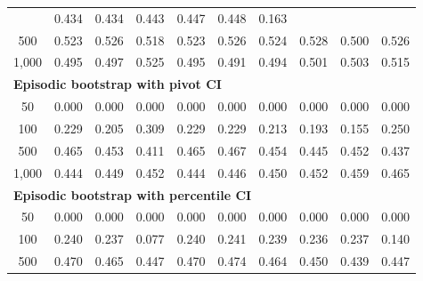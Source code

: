 \documentclass{article}
\numberwithin{equation}{section}
\begin{document}
\begin{table}[ht]
\begin{tabular}{c|ccc|cccccc}
& \cellcolor{covheat!67!white}0.434 & \cellcolor{covheat!67!white}0.434 & \cellcolor{covheat!72!white}0.443 & \cellcolor{covheat!74!white}0.447 & \cellcolor{covheat!74!white}0.448 & 0.163 \\
500
& \cellcolor{covheat!100!white}0.523 & \cellcolor{covheat!100!white}0.526 & \cellcolor{covheat!100!white}0.518
& \cellcolor{covheat!100!white}0.523 & \cellcolor{covheat!100!white}0.526 & \cellcolor{covheat!100!white}0.524 & \cellcolor{covheat!100!white}0.528 & \cellcolor{covheat!100!white}0.500 & \cellcolor{covheat!100!white}0.526 \\
1{,}000
& \cellcolor{covheat!98!white}0.495 & \cellcolor{covheat!98!white}0.497 & \cellcolor{covheat!100!white}0.525
& \cellcolor{covheat!98!white}0.495 & \cellcolor{covheat!96!white}0.491 & \cellcolor{covheat!97!white}0.494 & \cellcolor{covheat!100!white}0.501 & \cellcolor{covheat!100!white}0.503 & \cellcolor{covheat!100!white}0.515 \\
\hline
\multicolumn{10}{l}{\textbf{Episodic bootstrap with pivot CI}} \\ \hline
50
& 0.000 & 0.000 & 0.000
& 0.000 & 0.000 & 0.000 & 0.000 & 0.000 & 0.000 \\
100
& 0.229 & 0.205 & \cellcolor{covheat!5!white}0.309
& 0.229 & 0.229 & 0.213 & 0.193 & 0.155 & 0.250 \\
500
& \cellcolor{covheat!83!white}0.465 & \cellcolor{covheat!77!white}0.453 & \cellcolor{covheat!55!white}0.411
& \cellcolor{covheat!83!white}0.465 & \cellcolor{covheat!84!white}0.467 & \cellcolor{covheat!77!white}0.454 & \cellcolor{covheat!73!white}0.445 & \cellcolor{covheat!76!white}0.452 & \cellcolor{covheat!68!white}0.437 \\
1{,}000
& \cellcolor{covheat!72!white}0.444 & \cellcolor{covheat!75!white}0.449 & \cellcolor{covheat!76!white}0.452
& \cellcolor{covheat!72!white}0.444 & \cellcolor{covheat!73!white}0.446 & \cellcolor{covheat!75!white}0.450 & \cellcolor{covheat!76!white}0.452 & \cellcolor{covheat!80!white}0.459 & \cellcolor{covheat!83!white}0.465 \\
\hline
\multicolumn{10}{l}{\textbf{Episodic bootstrap with percentile CI}} \\ \hline
50
& 0.000 & 0.000 & 0.000
& 0.000 & 0.000 & 0.000 & 0.000 & 0.000 & 0.000 \\
100
& 0.240 & 0.237 & 0.077
& 0.240 & 0.241 & 0.239 & 0.236 & 0.237 & 0.140 \\
500
& \cellcolor{covheat!85!white}0.470 & \cellcolor{covheat!83!white}0.465 & \cellcolor{covheat!74!white}0.447
& \cellcolor{covheat!85!white}0.470 & \cellcolor{covheat!87!white}0.474 & \cellcolor{covheat!82!white}0.464 & \cellcolor{covheat!75!white}0.450 & \cellcolor{covheat!70!white}0.439 & \cellcolor{covheat!74!white}0.447 \\

\end{tabular}
\end{table}
\end{document}
